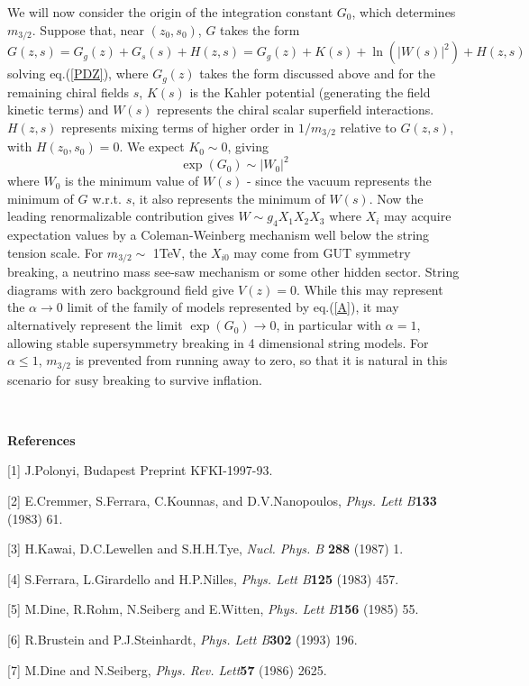 \documentclass[a4paper,12pt]{article}
\begin{document}
 We will now consider the origin of the integration constant $G_{0}$, which determines $m_{3/2}$.
 Suppose that, near $(z_{0},s_{0})$, $G$ takes the form
\begin{equation}\label{K}
    G(z,s) = G_{g}(z)+ G_{s}(s) + H(z,s) = G_{g}(z)+ K(s) +
    \ln(|W(s)|^{2}) + H(z,s)
\end{equation}
solving eq.(\ref{PDZ}), where $G_{g}(z)$ takes the form discussed
above and for the remaining chiral fields $s$, $K(s)$ is the
Kahler potential (generating the field kinetic terms) and $W(s)$
represents the chiral scalar superfield interactions. $H(z,s)$
represents mixing terms of higher order in $1/m_{3/2}$ relative to
$G(z,s)$, with $H(z_{0},s_{0})=0$. We expect $K_{0} \sim 0$,
giving
\begin{equation}\label{W}
    \exp{(G_{0})} \sim |W_{0}|^{2}
\end{equation}
where $W_{0}$ is the minimum value of $W(s)$ - since the vacuum
represents the minimum of $G$ w.r.t. $s$, it also represents the
minimum of $W(s)$. Now the leading renormalizable contribution
gives $W \sim g_{4}X_{1}X_{2}X_{3}$ where $X_{i}$ may acquire
expectation values by a Coleman-Weinberg mechanism well below the
string tension scale. For $m_{3/2}\sim$ 1TeV, the $X_{i0}$ may
come from GUT symmetry breaking, a neutrino mass see-saw mechanism
or some other hidden sector. String diagrams with zero background
field give $V(z) = 0$. While this may represent the $\alpha
\rightarrow 0$ limit of the family of models represented by
eq.(\ref{A}), it may alternatively represent the limit
$\exp{(G_{0})} \rightarrow 0$, in particular with $\alpha = 1$,
allowing stable supersymmetry breaking in 4 dimensional string
models. For $\alpha \leq 1$, $m_{3/2}$ is prevented from running
away to zero, so that it is natural in this scenario for susy
breaking to survive inflation.

\

\textbf{References}


[1] J.Polonyi, Budapest Preprint KFKI-1997-93.

[2] E.Cremmer, S.Ferrara, C.Kounnas, and D.V.Nanopoulos, {\em
Phys. Lett B\/}{\bf 133} (1983) 61.

[3] H.Kawai, D.C.Lewellen and S.H.H.Tye, {\em Nucl. Phys. B\/}{\bf
288} (1987) 1.

[4] S.Ferrara, L.Girardello and H.P.Nilles, {\em Phys. Lett
B\/}{\bf 125} (1983) 457.

[5] M.Dine, R.Rohm, N.Seiberg and E.Witten, {\em Phys. Lett
B\/}{\bf 156} (1985) 55.

[6] R.Brustein and P.J.Steinhardt, {\em Phys. Lett B\/}{\bf 302}
(1993) 196.

[7] M.Dine and N.Seiberg, {\em Phys. Rev. Lett\/}{\bf 57} (1986)
2625.
\end{document}
